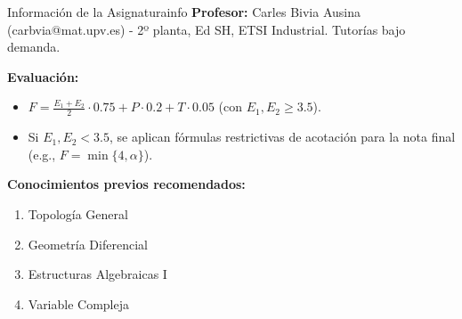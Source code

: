 
\begin{nota}{Información de la Asignatura}{info}
\textbf{Profesor:} Carles Bivia Ausina (carbvia@mat.upv.es) - 2º planta, Ed SH, ETSI Industrial. Tutorías bajo demanda.

\textbf{Evaluación:}
\begin{itemize}
    \item $F = \frac{E_1 + E_2}{2} \cdot 0.75 + P \cdot 0.2 + T \cdot 0.05$ (con $E_1, E_2 \geq 3.5$).
    \item Si $E_1, E_2 < 3.5$, se aplican fórmulas restrictivas de acotación para la nota final (e.g., $F = \min\{4, \alpha\}$).
\end{itemize}

\textbf{Conocimientos previos recomendados:}
\begin{enumerate}
    \item Topología General
    \item Geometría Diferencial
    \item Estructuras Algebraicas I
    \item Variable Compleja
\end{enumerate}
\end{nota}